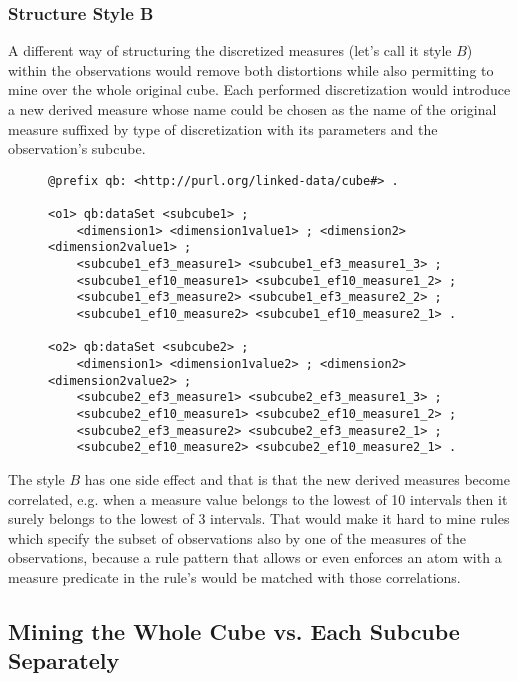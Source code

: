 \subsubsection{Structure Style B}

A different way of structuring the discretized measures (let's call it style $B$) within the observations would remove both distortions while also permitting to mine over the whole original cube. Each performed discretization would introduce a new derived measure whose name could be chosen as the name of the original measure suffixed by type of discretization with its parameters and the observation's subcube.

\begin{figure}[h]
\begin{lstlisting}[language = turtle, caption={Discretization style B}, label={discsample2},captionpos=b escapeinside={(*@}{@*)}]
@prefix qb: <http://purl.org/linked-data/cube#> .
                
<o1> qb:dataSet <subcube1> ;
    <dimension1> <dimension1value1> ; <dimension2> <dimension2value1> ;
    <subcube1_ef3_measure1> <subcube1_ef3_measure1_3> ;
    <subcube1_ef10_measure1> <subcube1_ef10_measure1_2> ;
    <subcube1_ef3_measure2> <subcube1_ef3_measure2_2> ; 
    <subcube1_ef10_measure2> <subcube1_ef10_measure2_1> .
       
<o2> qb:dataSet <subcube2> ;
    <dimension1> <dimension1value2> ; <dimension2> <dimension2value2> ;
    <subcube2_ef3_measure1> <subcube2_ef3_measure1_3> ;
    <subcube2_ef10_measure1> <subcube2_ef10_measure1_2> ;
    <subcube2_ef3_measure2> <subcube2_ef3_measure2_1> ;
    <subcube2_ef10_measure2> <subcube2_ef10_measure2_1> .
\end{lstlisting}
\end{figure}

The style $B$ has one side effect and that is that the new derived measures become correlated, e.g. when a measure value belongs to the lowest of 10 intervals then it surely belongs to the lowest of 3 intervals. That would make it hard to mine rules which specify the subset of observations also by one of the measures of the observations, because a rule pattern that allows or even enforces an atom with a measure predicate in the rule's would be matched with those correlations.

\subsection{Mining the Whole Cube vs. Each Subcube Separately\label{wholevssep}}

